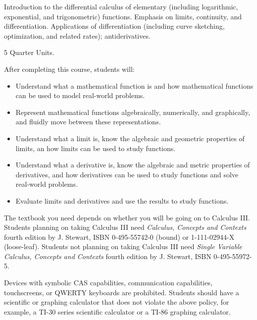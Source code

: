 \documentclass[10pt, letterpaper]{letter}
\begin{document}
\makesyllabushead


Introduction to the differential calculus of elementary
(including logarithmic, exponential, and trigonometric)
functions. Emphasis on limits, continuity, and differentiation.
Applications of differentiation (including curve sketching,
optimization, and related rates); antiderivatives.

5 Quarter Units.


After completing this course, students will:
\begin{itemize}
    \item Understand what a mathematical function is and how
        mathematical functions can be used to model real-world problems.
    \item Represent mathematical functions algebraically, numerically,
        and graphically, and fluidly move between these representations.
    \item Understand what a limit is, know the algebraic and geometric
        properties of limits, an how limits can be used to study
        functions.
    \item Understand what a derivative is, know the algebraic and
        metric properties of derivatives, and how derivatives can be
        used to study functions and solve real-world problems.
    \item Evaluate limits and derivatives and use the results to study
        functions.
\end{itemize}


The textbook you need depends on whether you will be going on to
Calculus III. Students planning on taking Calculus III need
\emph{Calculus, Concepts and Contexts} fourth edition by J. Stewart,
ISBN 0-495-55742-0 (bound) or 1-111-02944-X (loose-leaf). Students not
planning on taking Calculus III need \emph{Single Variable Calculus,
Concepts and Contexts} fourth edition by J. Stewart,
ISBN 0-495-55972-5.

Devices with symbolic CAS capabilities, communication capabilities,
touchscreens, or QWERTY keyboards are prohibited. Students should have a
scientific or graphing calculator that does not violate the above
policy, for example, a TI-30 series scientific calculator or a TI-86
graphing calculator.

\end{document}

